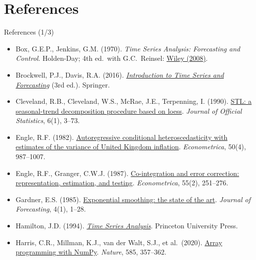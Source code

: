 \section{References}

\begin{frame}{References (1/3)}
\itemsize{\scriptsize}
\begin{itemize}
    \item Box, G.E.P., Jenkins, G.M. (1970). \emph{Time Series Analysis: Forecasting and Control}. Holden-Day; 4th ed.\ with G.C.\ Reinsel: \href{https://doi.org/10.1002/9781118619193}{Wiley (2008)}.
    \item Brockwell, P.J., Davis, R.A. (2016). \href{https://doi.org/10.1007/978-3-319-29854-2}{\emph{Introduction to Time Series and Forecasting}} (3rd ed.). Springer.
    \item Cleveland, R.B., Cleveland, W.S., McRae, J.E., Terpenning, I. (1990). \href{https://www.scb.se/contentassets/ca21efb41fee47d293bbee5bf7be7fb3/stl-a-seasonal-trend-decomposition-procedure-based-on-loess.pdf}{STL: a seasonal-trend decomposition procedure based on loess}. \emph{Journal of Official Statistics}, 6(1), 3--73.
    \item Engle, R.F. (1982). \href{https://doi.org/10.2307/1912773}{Autoregressive conditional heteroscedasticity with estimates of the variance of United Kingdom inflation}. \emph{Econometrica}, 50(4), 987--1007.
    \item Engle, R.F., Granger, C.W.J. (1987). \href{https://doi.org/10.2307/1913236}{Co-integration and error correction: representation, estimation, and testing}. \emph{Econometrica}, 55(2), 251--276.
    \item Gardner, E.S. (1985). \href{https://doi.org/10.1002/for.3980040103}{Exponential smoothing: the state of the art}. \emph{Journal of Forecasting}, 4(1), 1--28.
    \item Hamilton, J.D. (1994). \href{https://doi.org/10.2307/j.ctv14jx6sm}{\emph{Time Series Analysis}}. Princeton University Press.
    \item Harris, C.R., Millman, K.J., van der Walt, S.J., et al.\ (2020). \href{https://doi.org/10.1038/s41586-020-2649-2}{Array programming with NumPy}. \emph{Nature}, 585, 357--362.
\end{itemize}
\end{frame}

